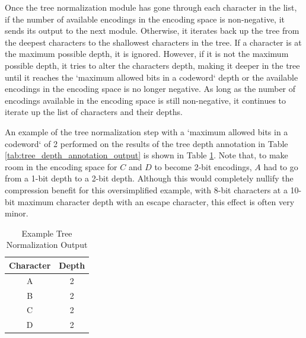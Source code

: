 \documentclass[doublespace,nopageskip]{VTthesis}
\begin{document}
Once the tree normalization module has gone through each character in the list, if the number of available encodings in the encoding space is non-negative, it sends its output to the next module. Otherwise, it iterates back up the tree from the deepest characters to the shallowest characters in the tree. If a character is at the maximum possible depth, it is ignored. However, if it is not the maximum possible depth, it tries to alter the characters depth, making it deeper in the tree until it reaches the `maximum allowed bits in a codeword` depth or the available encodings in the encoding space is no longer negative. As long as the number of encodings available in the encoding space is still non-negative, it continues to iterate up the list of characters and their depths.

An example of the tree normalization step with a `maximum allowed bits in a codeword` of 2 performed on the results of the tree depth annotation in Table \ref{tab:tree_depth_annotation_output} is shown in Table \ref{tab:tree_normalization_output}. Note that, to make room in the encoding space for $C$ and $D$ to become 2-bit encodings, $A$ had to go from a 1-bit depth to a 2-bit depth. Although this would completely nullify the compression benefit for this oversimplified example, with 8-bit characters at a 10-bit maximum character depth with an escape character, this effect is often very minor.

\begin{table}[htb]
	\centering
	\caption{Example Tree Normalization Output}
	\begin{tabular}{cc}
	    \toprule
	    Character & Depth \\
	    \midrule
	    A & 2 \\
	    \midrule
	    B & 2 \\
	    \midrule
	    C & 2 \\
	    \midrule
	    D & 2 \\
	    \bottomrule
	\end{tabular}
	\label{tab:tree_normalization_output}
\end{table}
\end{document}
